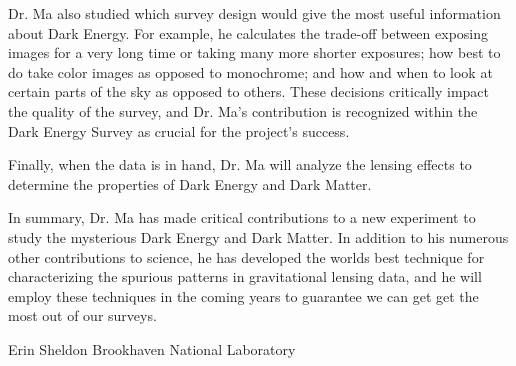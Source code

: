 \documentclass[12pt]{letter}
\begin{document}
Dr. Ma also studied which survey design would give the most useful information
about Dark Energy.  For example, he calculates the trade-off between exposing
images for a very long time or taking many more shorter exposures; how best to
do take color images as opposed to monochrome; and how and when to look at
certain parts of the sky as opposed to others.  These decisions critically
impact the quality of the survey, and Dr. Ma's contribution is recognized
within the Dark Energy Survey as crucial for the project's success.

Finally, when the data is in hand, Dr. Ma will analyze the lensing effects
to determine the properties of Dark Energy and Dark Matter.

In summary, Dr. Ma has made critical contributions to a new experiment to study
the mysterious Dark Energy and Dark Matter.  In addition to his numerous other
contributions to science, he has developed the worlds best technique for
characterizing the spurious patterns in gravitational lensing data, and he
will employ these techniques in the coming years to guarantee we can get
get the most out of our surveys.



{\noindent Erin Sheldon}
\newline
{\noindent Brookhaven National Laboratory}
\end{document}
